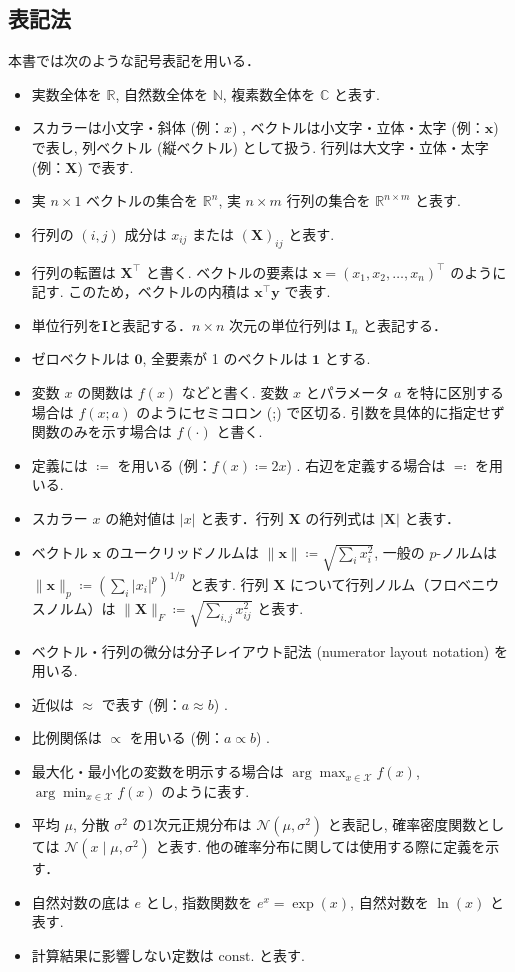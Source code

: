 \documentclass[titlepage]{ltjsbook}
\begin{document}
\subsection{表記法}
本書では次のような記号表記を用いる．
\begin{itemize}
\item 実数全体を $\mathbb{R}$, 自然数全体を $\mathbb{N}$, 複素数全体を $\mathbb{C}$ と表す. 
\item スカラーは小文字・斜体 (例：$x$) , ベクトルは小文字・立体・太字 (例：$\mathbf{x}$) で表し, 列ベクトル (縦ベクトル) として扱う. 行列は大文字・立体・太字 (例：$\mathbf{X}$) で表す. 
\item 実 $n\times 1$ ベクトルの集合を $\mathbb{R}^n$, 実 $n\times m$ 行列の集合を $\mathbb{R}^{n\times m}$ と表す. 
\item 行列の $(i,j)$ 成分は $x_{ij}$ または $(\mathbf{X})_{ij}$ と表す. 
\item 行列の転置は $\mathbf{X}^\top$ と書く. ベクトルの要素は $\mathbf{x} = (x_1, x_2, \dots, x_n)^\top$ のように記す. このため，ベクトルの内積は $\mathbf{x}^\top \mathbf{y}$ で表す. 
\item 単位行列を$\mathbf{I}$と表記する．$n \times n$ 次元の単位行列は $\mathbf{I}_n$ と表記する．
\item ゼロベクトルは $\mathbf{0}$, 全要素が 1 のベクトルは $\mathbf{1}$ とする. 
\item 変数 $x$ の関数は $f(x)$ などと書く. 変数 $x$ とパラメータ $a$ を特に区別する場合は $f(x; a)$ のようにセミコロン (;) で区切る. 引数を具体的に指定せず関数のみを示す場合は $f(\cdot)$ と書く. 
\item 定義には $\coloneqq$ を用いる (例：$f(x) \coloneqq 2x$) . 右辺を定義する場合は $\eqqcolon$ を用いる. 
\item スカラー $x$ の絶対値は $\lvert x \rvert$ と表す．行列 $\mathbf{X}$ の行列式は $\lvert \mathbf{X} \rvert$ と表す．
\item ベクトル $\mathbf{x}$ のユークリッドノルムは $\lVert \mathbf{x} \rVert \coloneqq \sqrt{\sum_i x_i^2}$, 一般の $p$-ノルムは $\lVert \mathbf{x} \rVert _p\coloneqq \left(\sum_i \lvert x_i \rvert ^p\right)^{1/p}$ と表す. 行列 $\mathbf{X}$ について行列ノルム（フロベニウスノルム）は $\lVert \mathbf{X} \rVert _F\coloneqq \sqrt{\sum_{i,j} x_{ij}^2}$ と表す. 
\item ベクトル・行列の微分は分子レイアウト記法 (numerator layout notation) を用いる. 
\item 近似は $\approx$ で表す (例：$a \approx b$) . 
\item 比例関係は $\propto$ を用いる (例：$a \propto b$) . 
\item 最大化・最小化の変数を明示する場合は $\arg\max_{x \in \mathcal{X}} f(x)$, $\arg\min_{x \in \mathcal{X}} f(x)$ のように表す. 
\item 平均 $\mu$, 分散 $\sigma^2$ の1次元正規分布は $\mathcal{N}(\mu, \sigma^2)$ と表記し, 確率密度関数としては $\mathcal{N}(x \mid \mu, \sigma^2)$ と表す. 他の確率分布に関しては使用する際に定義を示す．
\item 自然対数の底は $e$ とし, 指数関数を $e^x = \exp(x)$, 自然対数を $\ln(x)$ と表す. 
\item 計算結果に影響しない定数は $\mathrm{const.}$ と表す. 
\end{itemize}

\printbibliography[segment=\therefsegment,heading=subbibliography,title={参考文献}]
\end{document}
